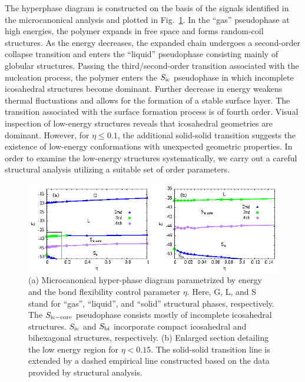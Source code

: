 \documentclass[12pt]{report}
\begin{document}
The hyperphase diagram is constructed on the basis of
the signals identified in the microcanonical analysis and plotted in
Fig.~\ref{phase_diagram}. 
In the ``gas'' pseudophase at high energies,
the polymer expands in free space and forms random-coil structures. As
the energy decreases, the expanded chain undergoes a second-order
collapse transition and enters the ``liquid'' pseudophase consisting
mainly of globular structures. Passing the third/second-order
transition associated with the nucleation process, the polymer enters
the $S_{\rm ic}$ pseudophase in which incomplete icosahedral structures
become dominant. Further decrease in energy weakens thermal fluctuations
and allows for the formation of a stable surface layer. The transition
associated with the surface formation process 
is of fourth order. Visual inspection of low-energy structures reveals
that icosahedral geometries are dominant. However, for $\eta \leq 0.1$,
the additional solid-solid transition suggests the existence of
low-energy conformations with unexpected geometric properties.
In order to examine the low-energy structures systematically, we
carry out a careful structural analysis utilizing a suitable set of
order parameters.
%
\begin{figure}
\center
    \includegraphics[width=\textwidth]{chapter6Figs/phaseDiag15.eps}%
    \caption{\label{phase_diagram} 
    (a) Microcanonical hyper-phase diagram parametrized by energy and
the bond flexibility control parameter $\eta$. Here, G, L, and S stand
for ``gas'', ``liquid'', and ``solid'' structural phases, respectively.
The $S_{\rm ic-core}$ pseudophase consists mostly of incomplete
icosahedral structures. $S_{\rm ic}$ and $S_{\rm bi}$ incorporate
compact icosahedral and bihexagonal structures, respectively. (b)
Enlarged section detailing the low energy region for $\eta < 0.15$. The
solid-solid transition line is extended by a dashed empirical line
constructed based on the data provided by structural analysis.}
\end{figure}
%
\end{document}
